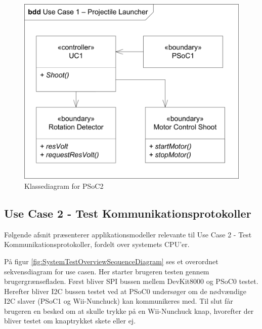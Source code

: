 \begin{figure}[H]
	\centering
	\includegraphics[scale=0.8]{Systemarkitektur/images/affyringKlassediagram.png}
	\caption{Klassediagram for PSoC2}
	\label{fig:klasseUC1PSoC2}
\end{figure}

\newpage
\subsection{Use Case 2 - Test Kommunikationsprotokoller}

Følgende afsnit præsenterer applikationsmodeller relevante til Use Case 2 - Test Kommunikationsprotokoller, fordelt over systemets CPU'er.

På figur \ref{fig:SystemTestOverviewSequenceDiagram} ses et overordnet sekvensdiagram for use casen. Her starter brugeren testen gennem brugergrænsefladen. Først bliver SPI bussen mellem DevKit8000 og PSoC0 testet. Herefter bliver I2C bussen testet ved at PSoC0 undersøger om de nødvændige I2C slaver (PSoC1 og Wii-Nunchuck) kan kommunikeres med. Til slut får brugeren en besked om at skulle trykke på en Wii-Nunchuck knap, hvorefter der bliver testet om knaptrykket skete eller ej.

